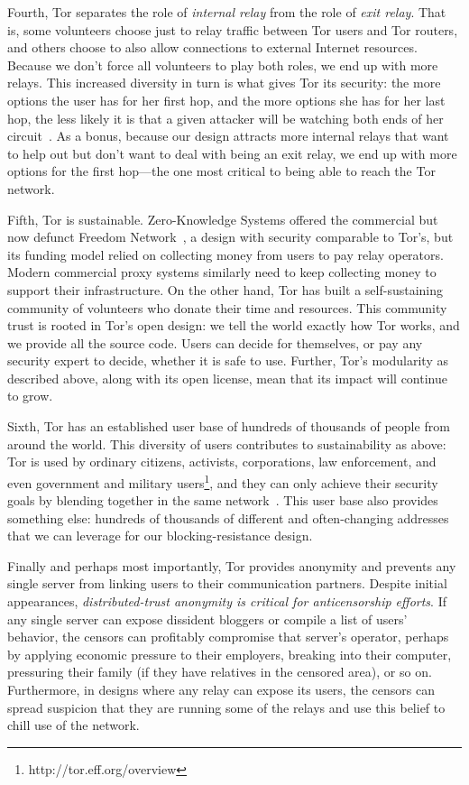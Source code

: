 \documentclass{llncs}
\begin{document}
Fourth, Tor separates the role of \emph{internal relay} from the
role of \emph{exit relay}. That is, some volunteers choose just to relay
traffic between Tor users and Tor routers, and others choose to also allow
connections to external Internet resources. Because we don't force all
volunteers to play both roles, we end up with more relays. This increased
diversity in turn is what gives Tor its security: the more options the
user has for her first hop, and the more options she has for her last hop,
the less likely it is that a given attacker will be watching both ends
of her circuit~\cite{tor-design}. As a bonus, because our design attracts
more internal relays that want to help out but don't want to deal with
being an exit relay, we end up with more options for the first hop---the
one most critical to being able to reach the Tor network.

Fifth, Tor is sustainable. Zero-Knowledge Systems offered the commercial
but now defunct Freedom Network~\cite{freedom21-security}, a design with
security comparable to Tor's, but its funding model relied on collecting
money from users to pay relay operators. Modern commercial proxy systems
similarly
need to keep collecting money to support their infrastructure. On the
other hand, Tor has built a self-sustaining community of volunteers who
donate their time and resources. This community trust is rooted in Tor's
open design: we tell the world exactly how Tor works, and we provide all
the source code. Users can decide for themselves, or pay any security
expert to decide, whether it is safe to use. Further, Tor's modularity
as described above, along with its open license, mean that its impact
will continue to grow.

Sixth, Tor has an established user base of hundreds of
thousands of people from around the world. This diversity of
users contributes to sustainability as above: Tor is used by
ordinary citizens, activists, corporations, law enforcement, and
even government and military users\footnote{http://tor.eff.org/overview},
and they can
only achieve their security goals by blending together in the same
network~\cite{econymics,usability:weis2006}. This user base also provides
something else: hundreds of thousands of different and often-changing
addresses that we can leverage for our blocking-resistance design.

Finally and perhaps most importantly, Tor provides anonymity and prevents any
single server from linking users to their communication partners.  Despite
initial appearances, {\it distributed-trust anonymity is critical for
anticensorship efforts}.  If any single server can expose dissident bloggers
or compile a list of users' behavior, the censors can profitably compromise
that server's operator, perhaps by  applying economic pressure to their
employers,
breaking into their computer, pressuring their family (if they have relatives
in the censored area), or so on.  Furthermore, in designs where any relay can
expose its users, the censors can spread suspicion that they are running some
of the relays and use this belief to chill use of the network.
\end{document}
